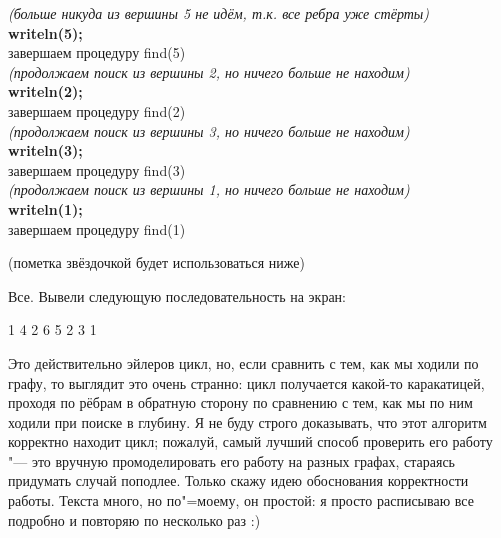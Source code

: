 {\ind \ind \ind \textit{(больше никуда из вершины 5 не идём, т.к. все ребра уже стёрты)}\\
\ind \ind \ind \textbf{writeln(5);}\\
\ind \ind \ind завершаем процедуру find(5)\\
\ind \ind \textit{(продолжаем поиск из вершины 2, но ничего больше не находим)}\\
\ind \ind \textbf{writeln(2);}\\
\ind \ind завершаем процедуру find(2)\\
\ind \textit{(продолжаем поиск из вершины 3, но ничего больше не находим)}\\
\ind \textbf{writeln(3);}\\
\ind завершаем процедуру find(3)\\
\textit{(продолжаем поиск из вершины 1, но ничего больше не находим)}\\
\textbf{writeln(1);}\\
завершаем процедуру find(1)
}

\vspace{0.3cm}
(пометка звёздочкой будет использоваться ниже)

Все. Вывели следующую последовательность на экран:

1 4 2 6 5 2 3 1

Это действительно эйлеров цикл, но, если сравнить с тем, как мы ходили по графу, то выглядит это 
очень странно: цикл получается какой-то каракатицей, проходя по рёбрам в обратную сторону по 
сравнению с тем, как мы по ним ходили при поиске в глубину. Я не буду строго доказывать, что этот 
алгоритм корректно находит цикл; пожалуй, самый лучший способ проверить его работу "--- это 
вручную промоделировать его работу на разных графах, стараясь придумать случай поподлее. Только 
скажу идею обоснования корректности работы. Текста много, но по"=моему, он простой: я просто 
расписываю все подробно и повторяю по несколько раз :) 

